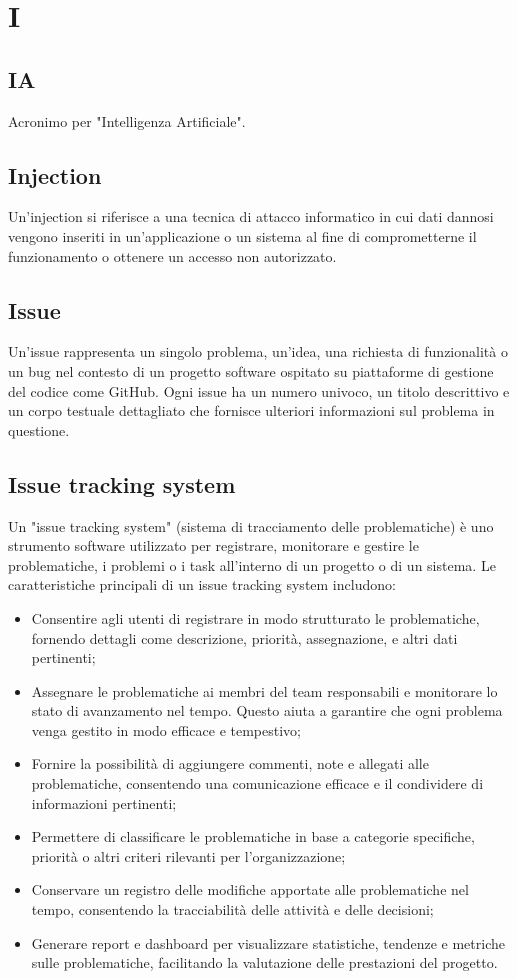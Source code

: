 \documentclass{article}
\begin{document}
\section{I}
\subsection{IA}
Acronimo per "Intelligenza Artificiale".

\subsection{Injection}
Un'injection si riferisce a una tecnica di attacco informatico in cui dati dannosi vengono inseriti in un'applicazione o un sistema al fine di comprometterne il funzionamento o ottenere un accesso non autorizzato.

\subsection{Issue}
Un'issue rappresenta un singolo problema, un'idea, una richiesta di funzionalità o un bug nel contesto di un progetto software ospitato su piattaforme di gestione del codice come GitHub. Ogni issue ha un numero univoco, un titolo descrittivo e un corpo testuale dettagliato che fornisce ulteriori informazioni sul problema in questione.

\subsection{Issue tracking system}
Un "issue tracking system" (sistema di tracciamento delle problematiche) è uno strumento software utilizzato per registrare, monitorare e gestire le problematiche, i problemi o i task all'interno di un progetto o di un sistema. Le caratteristiche principali di un issue tracking system includono:
\begin{itemize}
    \item Consentire agli utenti di registrare in modo strutturato le problematiche, fornendo dettagli come descrizione, priorità, assegnazione, e altri dati pertinenti;
    \item Assegnare le problematiche ai membri del team responsabili e monitorare lo stato di avanzamento nel tempo. Questo aiuta a garantire che ogni problema venga gestito in modo efficace e tempestivo;
    \item Fornire la possibilità di aggiungere commenti, note e allegati alle problematiche, consentendo una comunicazione efficace e il condividere di informazioni pertinenti;
    \item Permettere di classificare le problematiche in base a categorie specifiche, priorità o altri criteri rilevanti per l'organizzazione;
    \item Conservare un registro delle modifiche apportate alle problematiche nel tempo, consentendo la tracciabilità delle attività e delle decisioni;
    \item Generare report e dashboard per visualizzare statistiche, tendenze e metriche sulle problematiche, facilitando la valutazione delle prestazioni del progetto.
\end{itemize}
\end{document}
